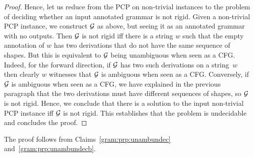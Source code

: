 \begin{proof}
  Hence, let us reduce from the PCP on non-trivial instances to the problem of
  deciding whether an input annotated grammar is not rigid. Given a
  non-trivial PCP instance, we construct $\mathcal{G}$ as above, but seeing it as an
  annotated grammar with no outputs. Then $\mathcal{G}$ is not rigid iff there is a
  string $w$ such that the empty annotation of $w$ has two derivations that do not
  have the same sequence of shapes. But this is equivalent to $\mathcal{G}$ being
  unambiguous when seen as a CFG. Indeed, for the forward direction, if $\mathcal{G}$ has
  two such derivations on a string~$w$ then clearly $w$ witnesses that $\mathcal{G}$ is
  ambiguous when seen as a CFG. Conversely, if $\mathcal{G}$ is ambiguous when seen as a
  CFG, we have explained in the previous paragraph that the two derivations must
  have different sequences of shapes, so $\mathcal{G}$ is not rigid. Hence, we
  conclude that there is a solution to the input non-trivial PCP instance iff
  $\mathcal{G}$ is not rigid. This establishes that the problem is undecidable
  and concludes the proof.
\end{proof}
The proof follows from Claims~\ref{gram:prp:unambundec} and~\ref{gram:prp:unambundecb}.
